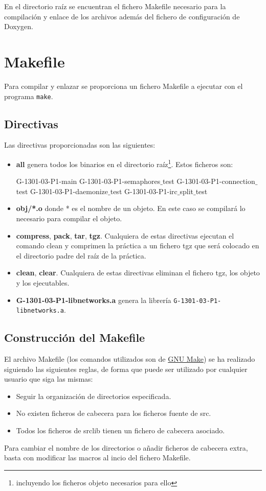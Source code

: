 \documentclass{mathnotes}
\begin{document}
En el directorio raíz se encuentran el fichero Makefile necesario para la compilación y enlace de los archivos además del fichero de configuración de Doxygen.

\section{Makefile}
Para compilar y enlazar se proporciona un fichero Makefile a ejecutar con el programa \texttt{make}.

\subsection{Directivas}
Las directivas proporcionadas son las siguientes:

\begin{itemize}
\item \textbf{all} genera todos los binarios en el directorio raíz\footnote{incluyendo los ficheros objeto necesarios para ello}. Estos ficheros son:

\subitem G-1301-03-P1-main
\subitem G-1301-03-P1-semaphores$\_$test
\subitem G-1301-03-P1-connection$\_$test
\subitem G-1301-03-P1-daemonize$\_$test
\subitem G-1301-03-P1-irc$\_$split$\_$test

\item \textbf{obj/*.o} donde * es el nombre de un objeto. En este caso se compilará lo necesario para compilar el objeto.

\item \textbf{compress}, \textbf{pack}, \textbf{tar}, \textbf{tgz}. Cualquiera de estas directivas ejecutan el comando clean y comprimen la práctica a un fichero tgz que será colocado en el directorio padre del raíz de la práctica.

\item \textbf{clean}, \textbf{clear}. Cualquiera de estas directivas eliminan el fichero tgz, los objeto y los ejecutables.

\item\textbf{G-1301-03-P1-libnetworks.a} genera la librería \texttt{G-1301-03-P1-libnetworks.a}.
\end{itemize}

\subsection{Construcción del Makefile}
El archivo Makefile (los comandos utilizados son de \href{https://www.gnu.org/software/make/manual/make.html#Top}{GNU Make}) se ha realizado siguiendo las siguientes reglas, de forma que puede ser utilizado por cualquier usuario que siga las mismas:
\begin{itemize}
\item Seguir la organización de directorios especificada.
\item No existen ficheros de cabecera para los ficheros fuente de src.
\item Todos los ficheros de srclib tienen un fichero de cabecera asociado.
\end{itemize}
Para cambiar el nombre de los directorios o añadir ficheros de cabecera extra, basta con modificar las macros al incio del fichero Makefile.
\end{document}
